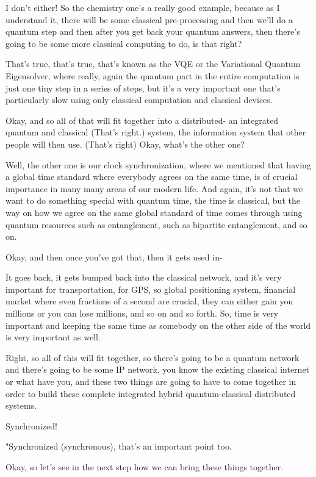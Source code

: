 I don't either! So the chemistry one's a really good example, because as I understand it, there will be some classical pre-processing and then we'll do a quantum step and then after you get back your quantum answers, then there's going to be some more classical computing to do, is that right?

That's true, that's true, that's known as the VQE or the Variational Quantum Eigensolver, where really, again the quantum part in the entire computation is just one tiny step in a series of steps, but it's a very important one that's particularly slow using only classical computation and classical devices.

Okay, and so all of that will fit together into a distributed- an integrated quantum and classical (That's right.) system, the information system that other people will then use. (That's right) Okay, what's the other one?

Well, the other one is our clock synchronization, where we mentioned that having a global time standard where everybody agrees on the same time, is of crucial importance in many many areas of our modern life. And again, it's not that we want to do something special with quantum time, the time is classical, but the way on how we agree on the same global standard of time comes through using quantum resources such as entanglement, such as bipartite entanglement, and so on.

Okay, and then once you've got that, then it gets used in-

It goes back, it gets bumped back into the classical network, and it's very important for transportation, for GPS, so global positioning system, financial market where even fractions of a second are crucial, they can either gain you millions or you can lose millions, and so on and so forth. So, time is very important and keeping the same time as somebody on the other side of the world is very important as well.

Right, so all of this will fit together, so there's going to be a quantum network and there's going to be some IP network, you know the existing classical internet or what have you, and these two things are going to have to come together in order to build these complete integrated hybrid quantum-classical distributed systems.

Synchronized!

"Synchronized (synchronous), that's an important point too.

Okay, so let's see in the next step how we can bring these things together.

